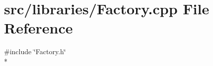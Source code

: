 \section{src/libraries/\-Factory.cpp File Reference}
\label{_factory_8cpp}
{\ttfamily \#include \char`\"{}Factory.\-h\char`\"{}}\\*
